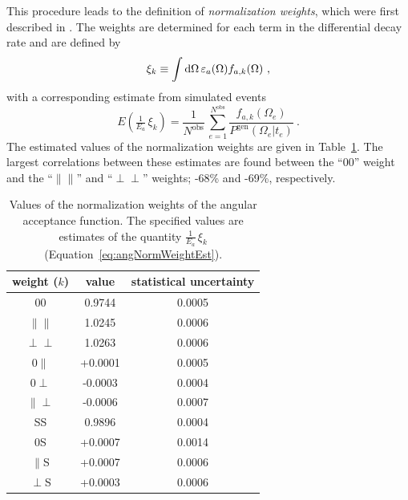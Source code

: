 This procedure leads to the definition of \emph{normalization weights}, which were first described in \cite{duPree:2010}. The weights are
determined for each term in the differential decay rate and are defined by
\begin{equation}
  \label{eq:angNormWeightDef}
  \xi_k \equiv \int\mathrm{d}\Omega\, \varepsilon_a(\Omega) f_{a,k}(\Omega)\ ,
\end{equation}
with a corresponding estimate from simulated events
\begin{equation}
  \label{eq:angNormWeightEst}
  E\left( \tfrac{1}{E_a}\, \xi_k \right)
      = \frac{1}{N^\text{obs}}\, \sum_{e=1}^{N^\text{obs}}\frac{f_{a,k}(\Omega_e)}{P^\text{gen}(\Omega_e|t_e)}\ .
\end{equation}
The estimated values of the normalization weights are given in Table~\ref{tab:angNormWeights}. The largest correlations between these
estimates are found between the ``00'' weight and the ``$\parallel\parallel$'' and ``$\perp\perp$'' weights; -68\% and -69\%, respectively.
\begin{table}[htbp]
  \centering
  \caption{Values of the normalization weights of the angular acceptance function.
           The specified values are estimates of the quantity $\tfrac{1}{E_a}\, \xi_k$ (Equation~\ref{eq:angNormWeightEst}).}
  \label{tab:angNormWeights}
  \begin{tabular}{ccc}
    \hline
    weight ($k$)  &  value  &  statistical uncertainty  \\
    \hline
    00                    &  0.9744   &  0.0005  \\
    $\parallel\parallel$  &  1.0245   &  0.0006  \\
    $\perp\perp$          &  1.0263   &  0.0006  \\
    0$\parallel$          &  +0.0001  &  0.0005  \\
    0$\perp$              &  -0.0003  &  0.0004  \\
    $\parallel\perp$      &  -0.0006  &  0.0007  \\
    SS                    &  0.9896   &  0.0004  \\
    0S                    &  +0.0007  &  0.0014  \\
    $\parallel$S          &  +0.0007  &  0.0006  \\
    $\perp$S              &  +0.0003  &  0.0006  \\
    \hline
  \end{tabular}
\end{table}

